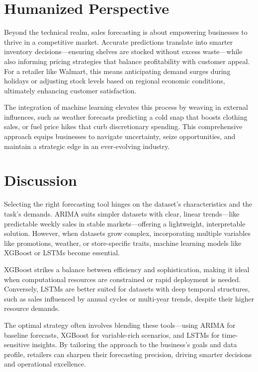 \section{Humanized Perspective}
Beyond the technical realm, sales forecasting is about empowering businesses to thrive in a competitive market. Accurate predictions translate into smarter inventory decisions—ensuring shelves are stocked without excess waste—while also informing pricing strategies that balance profitability with customer appeal. For a retailer like Walmart, this means anticipating demand surges during holidays or adjusting stock levels based on regional economic conditions, ultimately enhancing customer satisfaction.

The integration of machine learning elevates this process by weaving in external influences, such as weather forecasts predicting a cold snap that boosts clothing sales, or fuel price hikes that curb discretionary spending. This comprehensive approach equips businesses to navigate uncertainty, seize opportunities, and maintain a strategic edge in an ever-evolving industry.

\section{Discussion}
Selecting the right forecasting tool hinges on the dataset’s characteristics and the task’s demands. ARIMA suits simpler datasets with clear, linear trends—like predictable weekly sales in stable markets—offering a lightweight, interpretable solution. However, when datasets grow complex, incorporating multiple variables like promotions, weather, or store-specific traits, machine learning models like XGBoost or LSTMs become essential.

XGBoost strikes a balance between efficiency and sophistication, making it ideal when computational resources are constrained or rapid deployment is needed. Conversely, LSTMs are better suited for datasets with deep temporal structures, such as sales influenced by annual cycles or multi-year trends, despite their higher resource demands.

The optimal strategy often involves blending these tools—using ARIMA for baseline forecasts, XGBoost for variable-rich scenarios, and LSTMs for time-sensitive insights. By tailoring the approach to the business’s goals and data profile, retailers can sharpen their forecasting precision, driving smarter decisions and operational excellence.